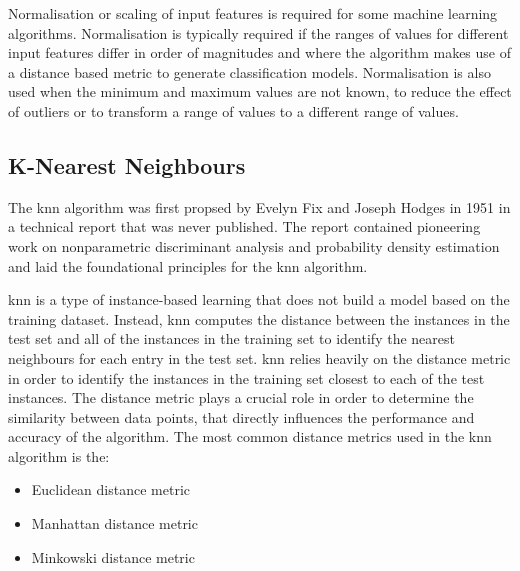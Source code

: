 \documentclass[10pt, conference]{IEEEtran}
\begin{document}
Normalisation or scaling of input features is required for some machine learning algorithms. Normalisation
is typically required if the ranges of values for different input features differ in order of magnitudes 
and where the algorithm makes use of a distance based metric to generate classification
models. Normalisation is also used when the minimum and maximum values are not known, to
reduce the effect of outliers or to transform a range of values to a different range of values.

\subsection{K-Nearest Neighbours}\label{KNN}

The \acrfull{knn} algorithm was first propsed by Evelyn Fix and Joseph Hodges in 1951 \cite{KNN_ref}
in a technical report that was never published. The report contained pioneering work on nonparametric
discriminant analysis and probability density estimation and laid the foundational principles for
the \acrshort{knn} algorithm.

\acrshort{knn} is a type of instance-based learning that does not build a model based on the training
dataset. Instead, \acrshort{knn} computes the distance between the instances in the test set and all
of the instances in the training set to identify the nearest neighbours for each entry in the test set.
\acrshort{knn} relies heavily on the distance metric in order to identify the instances in the training
set closest to each of the test instances. The distance metric plays a crucial role in order to determine
the similarity between data points, that directly influences the performance and accuracy of the algorithm.
The most common distance metrics used in the \acrshort{knn} algorithm is the:
\begin{itemize}
    \item Euclidean distance metric
    \item Manhattan distance metric
    \item Minkowski distance metric
\end{itemize}
\end{document}
